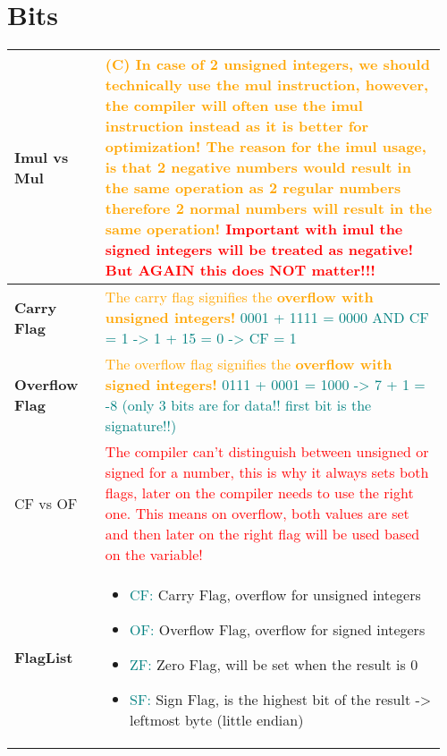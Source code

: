 \documentclass[main.tex,fontsize=8pt,paper=a4,paper=portrait,DIV=calc,]{scrartcl}
\begin{document}
\begin{table}[ht!]
\section{Bits}
\begin{tabular}{|m{0.2\linewidth}|m{0.755\linewidth}|}
\hline
\textbf{Imul vs Mul} & 
\textcolor{orange}{(C) In case of 2 unsigned integers, we should technically use the mul instruction,\newline
however, the compiler will often use the imul instruction instead as it is better for optimization!\newline
The reason for the imul usage, is that 2 negative numbers would result in the same operation as 2 regular numbers\newline 
therefore 2 normal numbers will result in the same operation!}\newline
\textcolor{red}{Important with imul the signed integers will be treated as negative! But AGAIN this does \textbf{NOT} matter!!!}\\
\hline
\textbf{Carry Flag} & 
\textcolor{orange}{The carry flag signifies the \textbf{overflow with unsigned integers!}}\newline
\textcolor{teal}{0001 + 1111 = 0000 AND CF = 1 -> 1 + 15 = 0 -> CF = 1}\\ 
\hline
\textbf{Overflow Flag} & 
\textcolor{orange}{The  overflow flag signifies the \textbf{overflow with signed integers!}}\newline
\textcolor{teal}{0111 + 0001 = 1000 -> 7 + 1 = -8 (only 3 bits are for data!! first bit is the signature!!)}\\
\hline
CF vs OF &
\textcolor{red}{The compiler can't distinguish between unsigned or signed for a number, this is why it always sets both flags, later on the compiler needs to use the right one.\newline
This means on overflow, both values are set and then later on the right flag will be used based on the variable!}\\
\hline
\textbf{FlagList} & 
\vspace{2mm}
\begin{itemize}
\item \textcolor{teal}{CF:} Carry Flag, overflow for unsigned integers 
\item \textcolor{teal}{OF:} Overflow Flag, overflow for signed integers
\item \textcolor{teal}{ZF:} Zero Flag, will be set when the result is 0
\item \textcolor{teal}{SF:} Sign Flag, is the highest bit of the result -> leftmost byte (little endian)

\end{itemize}
\end{tabular}
\end{table}
\end{document}
